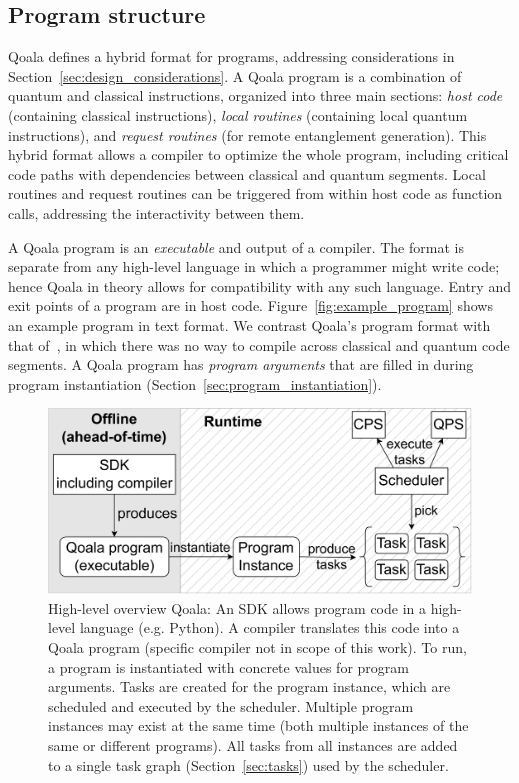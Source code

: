 \subsection{Program structure}
\label{sec:program_structure}
Qoala defines a hybrid format for programs, addressing considerations in Section~\ref{sec:design_considerations}.
A Qoala program is a combination of quantum and classical instructions, 
organized into three main sections: \textit{host code} (containing classical instructions), \textit{local routines} (containing local quantum instructions), 
and \textit{request routines} (for remote entanglement generation).
This hybrid format allows a compiler to optimize the whole program, including critical code paths with dependencies between classical and quantum segments.
Local routines and request routines can be triggered from within host code as function calls, addressing the interactivity between them.

A Qoala program is an \textit{executable} and output of a compiler.
The format is separate from any high-level language in which a programmer might write code; hence Qoala in theory allows for compatibility with any such language.
Entry and exit points of a program are in host code.
Figure~\ref{fig:example_program} shows an example program in text format.
We contrast Qoala's program format with that of~\cite{dahlberg2022netqasm}, in which there was no way to compile across classical and quantum code segments.
A Qoala program has \textit{program arguments} that are filled in during program instantiation (Section~\ref{sec:program_instantiation}).


\begin{figure}%
    \centering
    \includegraphics[width=\columnwidth]{figures/qoala/runtime_overview.png}
    \caption{High-level overview Qoala: An SDK allows program code in a high-level language (e.g. Python).
    A compiler translates this code into a Qoala program (specific compiler not in scope of this work).
    To run, a program is instantiated with concrete values for program arguments.
    Tasks are created for the program instance, which are scheduled and executed by the scheduler.
    Multiple program instances may exist at the same time (both multiple instances of the same or different programs).
    All tasks from all instances are added to a single task graph (Section~\ref{sec:tasks}) used by the scheduler.
    }
    \label{fig:runtime_overview}
\end{figure}




